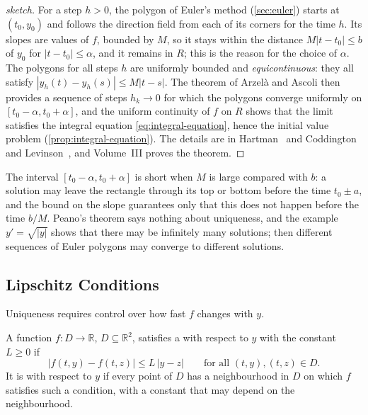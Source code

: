 \begin{proof}[sketch]
For a step $h>0$, the polygon of Euler's method (\cref{sec:euler}) starts at $(t_0,y_0)$ and follows the direction field from each of its corners for the time $h$. Its slopes are values of $f$, bounded by $M$, so it stays within the distance $M|t-t_0|\le b$ of $y_0$ for $|t-t_0|\le\alpha$, and it remains in $R$; this is the reason for the choice of $\alpha$. The polygons for all steps $h$ are uniformly bounded and \emph{equicontinuous}: they all satisfy $|y_h(t)-y_h(s)|\le M|t-s|$. The theorem of Arzel\`a and Ascoli then provides a sequence of steps $h_k\to0$ for which the polygons converge uniformly on $[t_0-\alpha,t_0+\alpha]$, and the uniform continuity of $f$ on $R$ shows that the limit satisfies the integral equation \eqref{eq:integral-equation}, hence the initial value problem (\cref{prop:integral-equation}). The details are in Hartman~\cite[Chap.~II]{hartman2002} and Coddington and Levinson~\cite[Chap.~1]{coddington1955}, and Volume~III proves the theorem.
\end{proof}

The interval $[t_0-\alpha,t_0+\alpha]$ is short when $M$ is large compared with $b$: a solution may leave the rectangle through its top or bottom before the time $t_0\pm a$, and the bound on the slope guarantees only that this does not happen before the time $b/M$. Peano's theorem says nothing about uniqueness, and the example $y'=\sqrt{|y|}$ shows that there may be infinitely many solutions; then different sequences of Euler polygons may converge to different solutions.

\subsection{Lipschitz Conditions}

Uniqueness requires control over how fast $f$ changes with $y$.

\begin{definition}
\label{def:lipschitz-y}
A function $f\colon D\to\mathbb R$, $D\subseteq\mathbb R^2$, satisfies a  with respect to $y$ with the constant $L\ge0$ if
\[
|f(t,y)-f(t,z)|\le L\,|y-z|\qquad\text{for all }(t,y),(t,z)\in D .
\]
It is  with respect to $y$ if every point of $D$ has a neighbourhood in $D$ on which $f$ satisfies such a condition, with a constant that may depend on the neighbourhood.
\end{definition}

